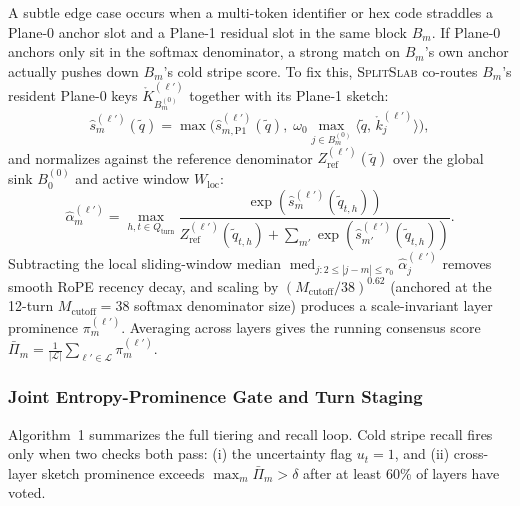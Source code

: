 \documentclass[pdflatex,sn-mathphys-num]{sn-jnl}
\theoremstyle{thmstyleone}
\newcommand{\SplitSlab}{\textsc{SplitSlab}}
\begin{document}
A subtle edge case occurs when a multi-token identifier or hex code straddles a Plane-0 anchor slot and a Plane-1 residual slot in the same block $B_m$. If Plane-0 anchors only sit in the softmax denominator, a strong match on $B_m$'s own anchor actually pushes down $B_m$'s cold stripe score. To fix this, \SplitSlab{} co-routes $B_m$'s resident Plane-0 keys $\mathring{K}_{B_m^{(0)}}^{(\ell')}$ together with its Plane-1 sketch:
\begin{equation}\label{eq:coroute}
\hat{s}_m^{(\ell')}(\tilde{q}) = \max\!\Big(\hat{s}_{m,\mathrm{P1}}^{(\ell')}(\tilde{q}),\; \omega_0 \max_{j \in B_m^{(0)}} \langle \tilde{q},\, \mathring{k}_j^{(\ell')} \rangle\Big),
\end{equation}
and normalizes against the reference denominator $Z_{\mathrm{ref}}^{(\ell')}(\tilde{q})$ over the global sink $B_0^{(0)}$ and active window $W_{\mathrm{loc}}$:
\begin{equation}\label{eq:alpha_hat}
\hat{\alpha}_m^{(\ell')} = \max_{h, t \in Q_{\mathrm{turn}}} \frac{\exp(\hat{s}_m^{(\ell')}(\tilde{q}_{t,h}))}{Z_{\mathrm{ref}}^{(\ell')}(\tilde{q}_{t,h}) + \sum_{m'} \exp(\hat{s}_{m'}^{(\ell')}(\tilde{q}_{t,h}))}.
\end{equation}
Subtracting the local sliding-window median $\operatorname{med}_{j : 2 \le |j-m| \le r_0} \hat{\alpha}_j^{(\ell')}$ removes smooth RoPE recency decay, and scaling by $(M_{\mathrm{cutoff}}/38)^{0.62}$ (anchored at the 12-turn $M_{\mathrm{cutoff}} = 38$ softmax denominator size) produces a scale-invariant layer prominence $\pi_m^{(\ell')}$. Averaging across layers gives the running consensus score $\bar{\Pi}_m = \frac{1}{|\mathcal{L}|}\sum_{\ell' \in \mathcal{L}} \pi_m^{(\ell')}$.

\subsubsection{Joint Entropy-Prominence Gate and Turn Staging}
Algorithm~1 summarizes the full tiering and recall loop. Cold stripe recall fires only when two checks both pass: (i) the uncertainty flag $u_t = 1$, and (ii) cross-layer sketch prominence exceeds $\max_m \bar{\Pi}_m > \delta$ after at least 60\% of layers have voted.
\end{document}
